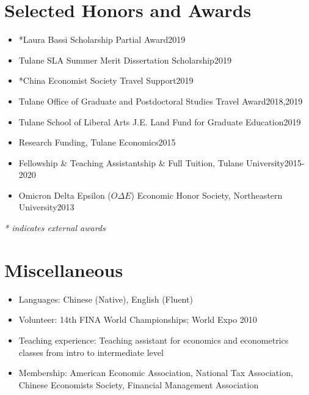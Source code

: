 \documentclass{resume}
\begin{document}
\section{Selected Honors and Awards}
\begin{itemize}[parsep=0.25ex]
  \item *Laura Bassi Scholarship Partial Award\hfill 2019
  \item Tulane SLA Summer Merit Dissertation Scholarship\hfill 2019
  \item *China Economist Society Travel Support\hfill 2019
  \item Tulane Office of Graduate and Postdoctoral Studies Travel Award\hfill 2018,2019 
  \item Tulane School of Liberal Arts J.E. Land Fund for Graduate Education\hfill 2019
  \item Research Funding, Tulane Economics\hfill 2015
  \item Fellowship \& Teaching Assistantship \& Full Tuition, Tulane University\hfill 2015-2020 
  \item Omicron Delta Epsilon ($O\Delta E$) Economic Honor Society, Northeastern University\hfill 2013
\end{itemize}
\emph{* indicates external awards}

\section{Miscellaneous}
\begin{itemize}[parsep=0.25ex]
  \item Languages: 
  Chinese (Native), English (Fluent)
  
  \item Volunteer:
  14th FINA World Championships; World Expo 2010
  
  \item Teaching experience:
  Teaching assistant for economics and econometrics classes from intro to intermediate level
  
  \item Membership:
American Economic Association, National Tax Association, Chinese Economists Society, Financial Management Association

\end{itemize}

%
%
\end{document}
